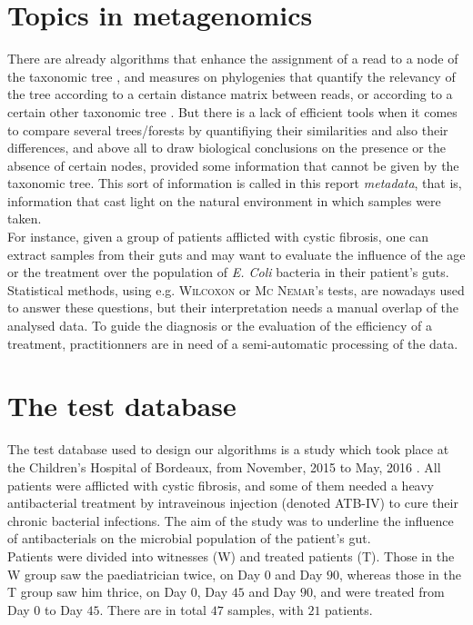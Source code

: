 \documentclass{report}
\begin{document}
\section{Topics in metagenomics}

There are already algorithms that enhance the assignment of a read to a node of the taxonomic tree \cite{Tango1}, and measures on phylogenies that quantify the relevancy of the tree according to a certain distance matrix between reads, or according to a certain other taxonomic tree \cite{RobinsonFoulds} \cite{Alignment}. But there is a lack of efficient tools \cite{Enaud} when it comes to compare several trees/forests by quantifiying their similarities and also their differences, and above all to draw biological conclusions on the presence or the absence of certain nodes, provided some information that cannot be given by the taxonomic tree. This sort of information is called in this report \emph{metadata}, that is, information that cast light on the natural environment in which samples were taken.\\

For instance, given a group of patients afflicted with cystic fibrosis, one can extract samples from their guts and may want to evaluate the influence of the age or the treatment over the population of \emph{E. Coli} bacteria in their patient's guts. Statistical methods, using e.g. \textsc{Wilcoxon} \cite{Wilcoxon} \cite{Whitney} or \textsc{Mc Nemar}'s \cite{McNemar} tests, are nowadays used to answer these questions, but their interpretation needs a manual overlap of the analysed data. To guide the diagnosis or the evaluation of the efficiency of a treatment, practitionners are in need of a semi-automatic processing of the data.

\section{The test database}

The test database used to design our algorithms is a study which took place at the Children's Hospital of Bordeaux, from November, 2015 to May, 2016 \cite{Enaud}. All patients were afflicted with cystic fibrosis, and some of them needed a heavy antibacterial treatment by intraveinous injection (denoted ATB-IV) to cure their chronic bacterial infections. The aim of the study was to underline the influence of antibacterials on the microbial population of the patient's gut.\\

Patients were divided into witnesses (\textsc{W}) and treated patients (\textsc{T}). Those in the \textsc{W} group saw the paediatrician twice, on Day $0$ and Day $90$, whereas those in the \textsc{T} group saw him thrice, on Day $0$, Day $45$ and Day $90$, and were treated from Day $0$ to Day $45$. There are in total $47$ samples, with $21$ patients.\\
\end{document}
